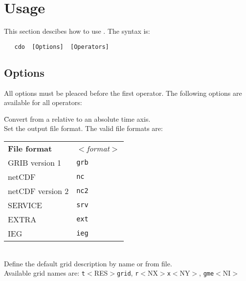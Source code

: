 \section{Usage}

This section descibes how to use \CDO.
The syntax is:
\begin{verbatim}
   cdo  [Options]  [Operators]
\end{verbatim}


\subsection{Options}

All options must be pleaced before the first operator.
The following options are available for all operators:

\begin{tabbing}
         \= Convert from a relative to an absolute time axis. \\
         \> Set the output file format. The valid file formats are: \\
         \> \parbox[r]{3in}{
              \vspace*{1mm}
              \hspace*{0cm}\begin{tabular}{|l|l|}
              \hline
              \rowcolor[gray]{.9}
              {\bf File format} & \sl $<$format$>$ \\
               GRIB version 1   & {\tt grb} \\
               netCDF           & {\tt nc}  \\
               netCDF version 2 & {\tt nc2} \\
               SERVICE          & {\tt srv} \\
               EXTRA            & {\tt ext} \\
               IEG              & {\tt ieg} \\
              \hline
              \end{tabular}
              \vspace*{1mm}
            } \\
         \> Define the default grid description by name or from file. \\
         \> Available grid names are: {\tt t}$<$RES$>${\tt grid}, {\tt r}$<$NX$>${\tt x}$<$NY$>$, {\tt gme}$<$NI$>$ \\

\end{tabbing}
